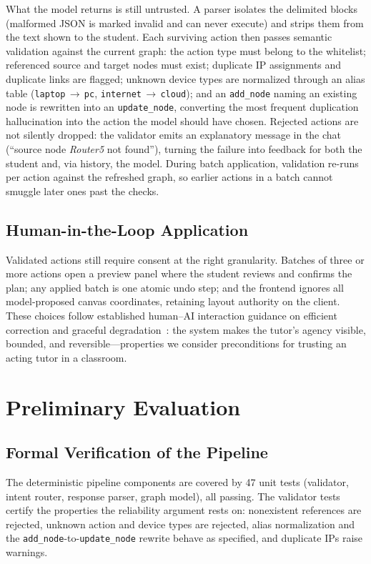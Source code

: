 \documentclass[conference,a4paper]{IEEEtran}
\begin{document}
What the model returns is still untrusted. A parser isolates the delimited blocks (malformed JSON is marked invalid and can never execute) and strips them from the text shown to the student. Each surviving action then passes semantic validation against the current graph: the action type must belong to the whitelist; referenced source and target nodes must exist; duplicate IP assignments and duplicate links are flagged; unknown device types are normalized through an alias table (\texttt{laptop}\,$\to$\,\texttt{pc}, \texttt{internet}\,$\to$\,\texttt{cloud}); and an \texttt{add\_node} naming an existing node is rewritten into an \texttt{update\_node}, converting the most frequent duplication hallucination into the action the model should have chosen. Rejected actions are not silently dropped: the validator emits an explanatory message in the chat (``source node \emph{Router5} not found''), turning the failure into feedback for both the student and, via history, the model. During batch application, validation re-runs per action against the refreshed graph, so earlier actions in a batch cannot smuggle later ones past the checks.

\subsection{Human-in-the-Loop Application}
Validated actions still require consent at the right granularity. Batches of three or more actions open a preview panel where the student reviews and confirms the plan; any applied batch is one atomic undo step; and the frontend ignores all model-proposed canvas coordinates, retaining layout authority on the client. These choices follow established human--AI interaction guidance on efficient correction and graceful degradation~\cite{amershi2019guidelines}: the system makes the tutor's agency visible, bounded, and reversible---properties we consider preconditions for trusting an acting tutor in a classroom.

\section{Preliminary Evaluation}
\subsection{Formal Verification of the Pipeline}
The deterministic pipeline components are covered by 47 unit tests (validator, intent router, response parser, graph model), all passing. The validator tests certify the properties the reliability argument rests on: nonexistent references are rejected, unknown action and device types are rejected, alias normalization and the \texttt{add\_node}-to-\texttt{update\_node} rewrite behave as specified, and duplicate IPs raise warnings.
\end{document}
